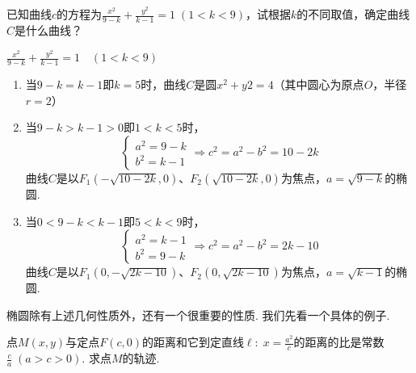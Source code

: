 \begin{example}
已知曲线$c$的方程为$\frac{x^2}{9-k}+\frac{y^2}{k-1}=1\; (1<k<9)$，试根据$k$的不同取值，确定曲线$C$是什么曲线？
\end{example}

\begin{solution}
    $\frac{x^2}{9-k}+\frac{y^2}{k-1}=1\quad (1<k<9)$
\begin{enumerate}[(1)]
    \item  当$9-k=k-1$即$k=5$时，曲线$C$是圆$x^2+y2=4$（其中圆心为原点$O$，半径$r=2$）
    \item  当$9-k>k-1>0$即$1<k<5$时，
\[\begin{cases}
    a^2=9-k\\ b^2=k-1
\end{cases}\Rightarrow c^2=a^2-b^2=10-2k\]
    曲线$C$是以$F_1\left(-\sqrt{10-2k},0\right)$、$F_2\left(\sqrt{10-2k},0\right)$为焦点，$a=\sqrt{9-k}$的椭圆.
    \item  当$0<9-k<k-1$即$5<k<9$时，
    \[\begin{cases}
        a^2=k-1\\ b^2=9-k
    \end{cases}\Rightarrow c^2=a^2-b^2=2k-10\]
    曲线$C$是以$F_1\left(0,-\sqrt{2k-10}\right)$、$F_2\left(0,\sqrt{2k-10}\right)$为焦点，$a=\sqrt{k-1}$的椭圆.
 \end{enumerate}
\end{solution}

椭圆除有上述几何性质外，还有一个很重要的性质. 我们先看一个具体的例子.   

\begin{example}
    点$M(x,y)$与定点$F(c,0)$的距离和它到定直线$\ell:\; x=\frac{a^2}{c}$的距离的比是常数$\frac{c}{a}\; (a>c>0)$. 求点$M$的轨迹.
\end{example}

